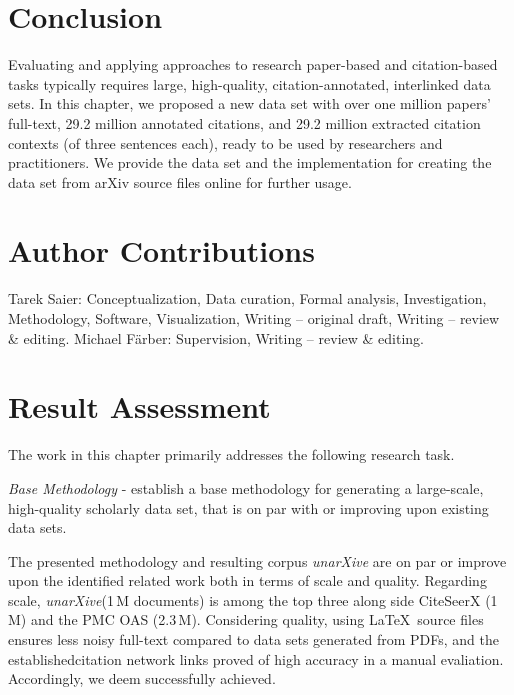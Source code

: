 \section{Conclusion}
\label{sec:conclusion}

Evaluating and applying approaches to research paper-based and citation-based tasks typically requires large, high-quality, citation-annotated, interlinked data sets. In this chapter, we proposed a new data set with over one million papers' full-text, 29.2 million annotated citations, and 29.2 million extracted citation contexts (of three sentences each), ready to be used by researchers and practitioners.
We provide the data set and the implementation for creating the data set from arXiv source files online for further usage.


\section{Author Contributions}  %
Tarek Saier: Conceptualization, Data curation, Formal analysis, Investigation, Methodology, Software, Visualization, Writing -- original draft, Writing -- review \& editing. Michael F{\"a}rber: Supervision, Writing -- review \& editing.

\section{Result Assessment}
\label{sec:corpus-assessment}

The work in this chapter primarily addresses the following research task.

\begin{rtlist}
    \item \textit{Base Methodology} - establish a base methodology for generating a large-scale, high-quality scholarly data set, that is on par with or improving upon existing data sets.
\end{rtlist}

The presented methodology and resulting corpus \emph{unarXive} are on par or improve upon the identified related work both in terms of scale and quality. Regarding scale, \emph{unarXive}(1\,M documents) is among the top three along side CiteSeerX (1\,M) and the PMC OAS (2.3\,M). Considering quality, using \LaTeX\ source files ensures less noisy full-text compared to data sets generated from PDFs, and the establishedcitation network links proved of high accuracy in a manual evaliation. Accordingly, we deem  successfully achieved.

